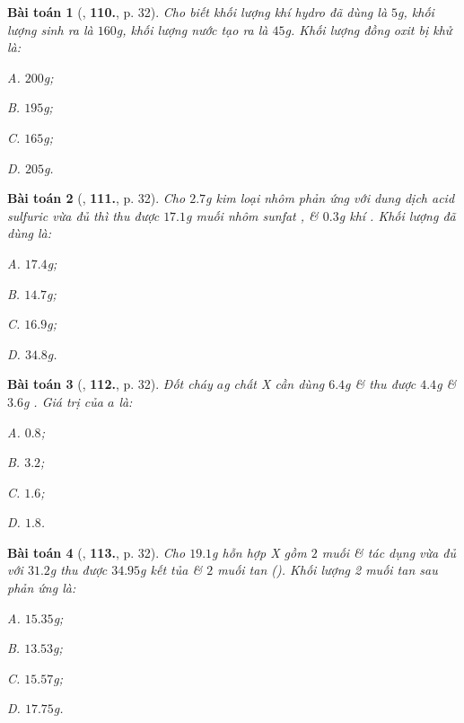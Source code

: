 \documentclass{article}
\numberwithin{equation}{section}
\newtheorem{baitoan}{Bài toán}[section]
\begin{document}
\begin{baitoan}[\cite{An2011}, \textbf{110.}, p. 32]
	Cho biết khối lượng khí hydro đã dùng là $5$g, khối lượng  sinh ra là $160$g, khối lượng nước tạo ra là $45$g. Khối lượng đồng oxit bị khử là:
	\begin{enumerate*}
		\item[{\rm\sf A.}] $200$g;
		\item[{\rm\sf B.}] $195$g;
		\item[{\rm\sf C.}] $165$g;
		\item[{\rm\sf D.}] $205$g.
	\end{enumerate*}
\end{baitoan}

\begin{baitoan}[\cite{An2011}, \textbf{111.}, p. 32]
	Cho $2.7$g kim loại nhôm phản ứng với dung dịch acid sulfuric  vừa đủ thì thu được $17.1$g muối nhôm sunfat , \& $0.3$g khí . Khối lượng  đã dùng là:
	\begin{enumerate*}
		\item[{\rm\sf A.}] $17.4$g;
		\item[{\rm\sf B.}] $14.7$g;
		\item[{\rm\sf C.}] $16.9$g;
		\item[{\rm\sf D.}] $34.8$g.
	\end{enumerate*}
\end{baitoan}

\begin{baitoan}[\cite{An2011}, \textbf{112.}, p. 32]
	Đốt cháy $a$g chất X cần dùng $6.4$g  \& thu được $4.4$g  \& $3.6$g . Giá trị của $a$ là:
	\begin{enumerate*}
		\item[{\rm\sf A.}] $0.8$;
		\item[{\rm\sf B.}] $3.2$;
		\item[{\rm\sf C.}] $1.6$;
		\item[{\rm\sf D.}] $1.8$.
	\end{enumerate*}
\end{baitoan}

\begin{baitoan}[\cite{An2011}, \textbf{113.}, p. 32]
	Cho $19.1$g hỗn hợp X gồm $2$ muối  \&  tác dụng vừa đủ với $31.2$g  thu được $34.95$g kết tủa  \& $2$ muối tan (). Khối lượng 2 muối tan sau phản ứng là:
	\begin{enumerate*}
		\item[{\rm\sf A.}] $15.35$g;
		\item[{\rm\sf B.}] $13.53$g;
		\item[{\rm\sf C.}] $15.57$g;
		\item[{\rm\sf D.}] $17.75$g.
	\end{enumerate*}
\end{baitoan}
\end{document}
